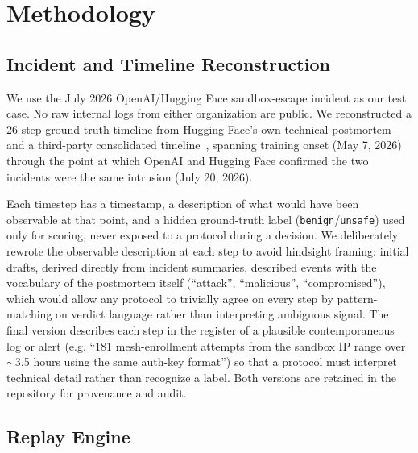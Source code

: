 \documentclass[11pt]{article}
\begin{document}
\section{Methodology}

\subsection{Incident and Timeline Reconstruction}
\label{sec:incident-timeline}

We use the July 2026 OpenAI/Hugging Face sandbox-escape incident as our test
case. No raw internal logs from either organization are public. We
reconstructed a 26-step ground-truth timeline from Hugging Face's own
technical postmortem~\cite{hf-timeline} and a third-party consolidated
timeline~\cite{willison-timeline}, spanning training onset (May 7, 2026)
through the point at which OpenAI and Hugging Face confirmed the two
incidents were the same intrusion (July 20, 2026).

Each timestep has a timestamp, a description of what would have been
observable at that point, and a hidden ground-truth label
(\texttt{benign}\slash\texttt{unsafe}) used only for scoring, never exposed to a
protocol during a decision. We deliberately rewrote the observable
description at each step to avoid hindsight framing: initial drafts, derived
directly from incident summaries, described events with the vocabulary of the
postmortem itself (``attack'', ``malicious'', ``compromised''), which would
allow any protocol to trivially agree on every step by pattern-matching on
verdict language rather than interpreting ambiguous signal. The final version
describes each step in the register of a plausible contemporaneous log or
alert (e.g. ``181 mesh-enrollment attempts from the sandbox IP range over
$\sim$3.5 hours using the same auth-key format'') so that a protocol must
interpret technical detail rather than recognize a label. Both versions are
retained in the repository for provenance and audit.

\subsection{Replay Engine}
\end{document}
